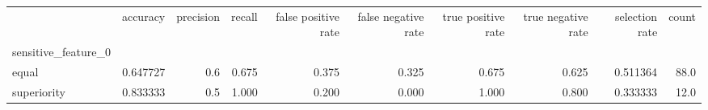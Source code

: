 \begin{tabular}{lrrrrrrrrr}
\toprule
{} &  accuracy &  precision &  recall &  false positive rate &  false negative rate &  true positive rate &  true negative rate &  selection rate &  count \\
sensitive\_feature\_0 &           &            &         &                      &                      &                     &                     &                 &        \\
\midrule
equal               &  0.647727 &        0.6 &   0.675 &                0.375 &                0.325 &               0.675 &               0.625 &        0.511364 &   88.0 \\
superiority         &  0.833333 &        0.5 &   1.000 &                0.200 &                0.000 &               1.000 &               0.800 &        0.333333 &   12.0 \\
\bottomrule
\end{tabular}
